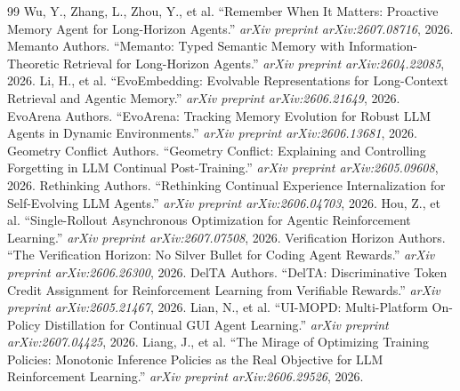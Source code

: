 \documentclass[11pt,a4paper]{article}
\begin{document}
\begin{thebibliography}{99}
 Wu, Y., Zhang, L., Zhou, Y., et al. ``Remember When It Matters: Proactive Memory Agent for Long-Horizon Agents.'' \emph{arXiv preprint arXiv:2607.08716}, 2026.
 Memanto Authors. ``Memanto: Typed Semantic Memory with Information-Theoretic Retrieval for Long-Horizon Agents.'' \emph{arXiv preprint arXiv:2604.22085}, 2026.
 Li, H., et al. ``EvoEmbedding: Evolvable Representations for Long-Context Retrieval and Agentic Memory.'' \emph{arXiv preprint arXiv:2606.21649}, 2026.
 EvoArena Authors. ``EvoArena: Tracking Memory Evolution for Robust LLM Agents in Dynamic Environments.'' \emph{arXiv preprint arXiv:2606.13681}, 2026.
 Geometry Conflict Authors. ``Geometry Conflict: Explaining and Controlling Forgetting in LLM Continual Post-Training.'' \emph{arXiv preprint arXiv:2605.09608}, 2026.
 Rethinking Authors. ``Rethinking Continual Experience Internalization for Self-Evolving LLM Agents.'' \emph{arXiv preprint arXiv:2606.04703}, 2026.
 Hou, Z., et al. ``Single-Rollout Asynchronous Optimization for Agentic Reinforcement Learning.'' \emph{arXiv preprint arXiv:2607.07508}, 2026.
 Verification Horizon Authors. ``The Verification Horizon: No Silver Bullet for Coding Agent Rewards.'' \emph{arXiv preprint arXiv:2606.26300}, 2026.
 DelTA Authors. ``DelTA: Discriminative Token Credit Assignment for Reinforcement Learning from Verifiable Rewards.'' \emph{arXiv preprint arXiv:2605.21467}, 2026.
 Lian, N., et al. ``UI-MOPD: Multi-Platform On-Policy Distillation for Continual GUI Agent Learning.'' \emph{arXiv preprint arXiv:2607.04425}, 2026.
 Liang, J., et al. ``The Mirage of Optimizing Training Policies: Monotonic Inference Policies as the Real Objective for LLM Reinforcement Learning.'' \emph{arXiv preprint arXiv:2606.29526}, 2026.
\end{thebibliography}
\end{document}
